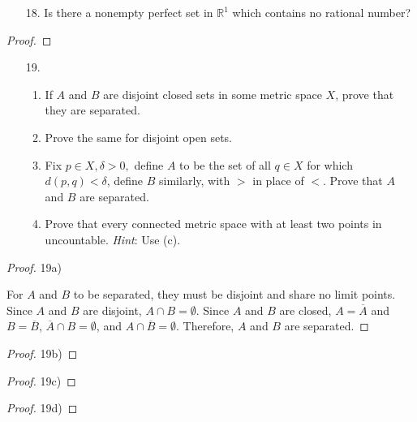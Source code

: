 \documentclass[10pt]{article}
\theoremstyle{definition}
\theoremstyle{plain}
\newcommand{\R}{\mathbb{R}}
\begin{document}
\pagebreak




\begin{enumerate}
\item[18.] Is there a nonempty perfect set in $\R^1$ which contains no rational number?
\end{enumerate}

\begin{proof}

\end{proof}




\pagebreak




\begin{enumerate}
\item[19.]
\begin{enumerate}
\item If $A$ and $B$ are disjoint closed sets in some metric space $X$, prove that they are separated.
\item Prove the same for disjoint open sets.
\item Fix $p\in X, \delta >0,$ define $A$ to be the set of all $q\in X$ for which $d(p,q)<\delta$, define $B$ similarly, with $>$ in place of $<$. Prove that $A$ and $B$ are separated.
\item Prove that every connected metric space with at least two points in uncountable. \textit{Hint}: Use (c).
\end{enumerate}
\end{enumerate}

\begin{proof}
19a)

For $A$ and $B$ to be separated, they must be disjoint and share no limit points. Since $A$ and $B$ are disjoint, $A\cap B=\emptyset$. Since $A$ and $B$ are closed, $A=\overline{A}$ and $B=\overline{B}$, $\overline{A}\cap B=\emptyset$, and $A\cap\overline{B}=\emptyset$. Therefore, $A$ and $B$ are separated.
\end{proof}

\begin{proof}
19b)


\end{proof}


\begin{proof}
19c)


\end{proof}


\begin{proof}
19d)


\end{proof}
\end{document}
